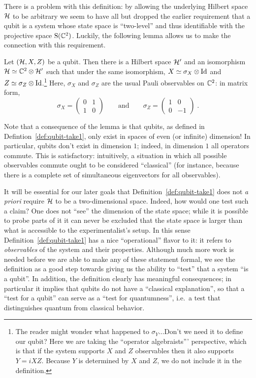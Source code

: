 There is a problem with this definition: by allowing the underlying Hilbert space $\mathcal{H}$ to be arbitrary we seem to have all but dropped the earlier requirement that a qubit is a system whose state space is ``two-level'' and thus identifiable with the projective space $\mathrm{S}(\mathbb{C}^2)$. Luckily, the following lemma allows us to make the connection with this requirement. 

\begin{lemma}\label{lem:qubit-c2}
Let $(\mathcal{H},X,Z)$ be a qubit. Then there is a Hilbert space $\mathcal{H}'$ and an isomorphism $\mathcal{H}\simeq \mathbb{C}^2 \otimes \mathcal{H}'$ such that under the same isomorphism, $X\simeq \sigma_X\otimes \mathop{\rm Id}\nolimits$ and $Z\simeq \sigma_Z \otimes \mathop{\rm Id}\nolimits$.\footnote{The reader might wonder what happened to $\sigma_Y$...Don't we need it to define our qubit? Here we are taking the ``operator algebraists''' perspective, which is that if the system supports $X$ and $Z$ observables then it also supports $Y=iXZ$. Because $Y$ is determined by $X$ and $Z$, we do not include it in the definition.} Here, $\sigma_X$ and $\sigma_Z$ are the usual Pauli observables on $\mathbb{C}^2$: in matrix form, 
\[ \sigma_X = \begin{pmatrix} 0 & 1 \\ 1 & 0 \end{pmatrix} \qquad\text{and}\qquad\sigma_Z = \begin{pmatrix} 1 & 0 \\ 0 & -1 \end{pmatrix}\;.\]
\end{lemma}

Note that a consequence of the lemma is that qubits, as defined in Defintion~\ref{def:qubit-take1}, only exist in spaces of even (or infinite) dimension! In particular, qubits don't exist in dimension $1$; indeed, in dimension $1$ all operators commute. This is satisfactory: intuitively, a situation in which all possible observables commute ought to be considered ``classical'' (for instance, because there is a complete set of simultaneous eigenvectors for all observables). 

It will be essential for our later goals that Definition~\ref{def:qubit-take1} does not \emph{a priori} require $\mathcal{H}$ to be a two-dimensional space. Indeed, how would one test such a claim? One does not ``see'' the dimension of the state space; while it is possible to probe parts of it it can never be excluded that the state space is larger than what is accessible to the experimentalist's setup. In this sense Definition~\ref{def:qubit-take1} has a nice ``operational'' flavor to it: it refers to \emph{observables} of the system and their properties.  Although much more work is needed before we are able to make any of these statement formal, we see the definition as a good step towards giving us the ability to ``test'' that a system ``is a qubit''. In addition, the definition clearly has meaningful consequences; in particular it implies that qubits do not have a ``classical explanation'', so that a ``test for a qubit'' can serve as a ``test for quantumness'', i.e.\ a test that distinguishes quantum from classical behavior. 

